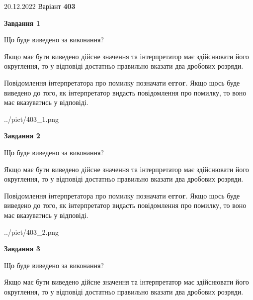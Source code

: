 \documentclass[12pt, ukrainian]{article}
\begin{document}
{20.12.2022 Варіант \No \textbf { 403 }\par}
{
\begin {Large}

{\begin {center}\textbf{Завдання 1}\end {center}}\par
Що буде виведено за виконання? \par

Якщо має бути виведено дійсне значення та інтерпретатор має здійснювати його округлення, 
то у відповіді достатньо правильно вказати два дробових розряди.

Повідомлення інтерпретатора про помилку позначати \textbf{error}.
Якщо щось буде виведено до того, як інтерпретатор видасть повідомлення про помилку, 
то воно має вказуватись у відповіді. \par

\begin{center}
	{../pict/403_1.png}
\end{center}
\newpage

{\begin {center}\textbf{Завдання 2}\end {center}}\par
Що буде виведено за виконання? \par

Якщо має бути виведено дійсне значення та інтерпретатор має здійснювати його округлення, 
то у відповіді достатньо правильно вказати два дробових розряди.

Повідомлення інтерпретатора про помилку позначати \textbf{error}.
Якщо щось буде виведено до того, як інтерпретатор видасть повідомлення про помилку, 
то воно має вказуватись у відповіді. \par

\begin{center}
	{../pict/403_2.png}
\end{center}
\newpage

{\begin {center}\textbf{Завдання 3}\end {center}}\par
Що буде виведено за виконання? \par

Якщо має бути виведено дійсне значення та інтерпретатор має здійснювати його округлення, 
то у відповіді достатньо правильно вказати два дробових розряди.


\end{Large}}
\end{document}
